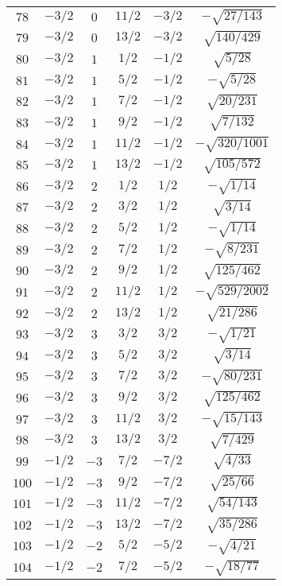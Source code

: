 \begin{table}
\begin{center}
\begin{tabular}{|c|c|c|c|c|c|}
$78$ & $-3/2$ & $0$ & $11/2$ & $-3/2$ & $-\sqrt{27/143}$ \\ 
$79$ & $-3/2$ & $0$ & $13/2$ & $-3/2$ & $\sqrt{140/429}$ \\ 
$80$ & $-3/2$ & $1$ & $1/2$ & $-1/2$ & $\sqrt{5/28}$ \\ 
$81$ & $-3/2$ & $1$ & $5/2$ & $-1/2$ & $-\sqrt{5/28}$ \\ 
$82$ & $-3/2$ & $1$ & $7/2$ & $-1/2$ & $\sqrt{20/231}$ \\ 
$83$ & $-3/2$ & $1$ & $9/2$ & $-1/2$ & $\sqrt{7/132}$ \\ 
$84$ & $-3/2$ & $1$ & $11/2$ & $-1/2$ & $-\sqrt{320/1001}$ \\ 
$85$ & $-3/2$ & $1$ & $13/2$ & $-1/2$ & $\sqrt{105/572}$ \\ 
$86$ & $-3/2$ & $2$ & $1/2$ & $1/2$ & $-\sqrt{1/14}$ \\ 
$87$ & $-3/2$ & $2$ & $3/2$ & $1/2$ & $\sqrt{3/14}$ \\ 
$88$ & $-3/2$ & $2$ & $5/2$ & $1/2$ & $-\sqrt{1/14}$ \\ 
$89$ & $-3/2$ & $2$ & $7/2$ & $1/2$ & $-\sqrt{8/231}$ \\ 
$90$ & $-3/2$ & $2$ & $9/2$ & $1/2$ & $\sqrt{125/462}$ \\ 
$91$ & $-3/2$ & $2$ & $11/2$ & $1/2$ & $-\sqrt{529/2002}$ \\ 
$92$ & $-3/2$ & $2$ & $13/2$ & $1/2$ & $\sqrt{21/286}$ \\ 
$93$ & $-3/2$ & $3$ & $3/2$ & $3/2$ & $-\sqrt{1/21}$ \\ 
$94$ & $-3/2$ & $3$ & $5/2$ & $3/2$ & $\sqrt{3/14}$ \\ 
$95$ & $-3/2$ & $3$ & $7/2$ & $3/2$ & $-\sqrt{80/231}$ \\ 
$96$ & $-3/2$ & $3$ & $9/2$ & $3/2$ & $\sqrt{125/462}$ \\ 
$97$ & $-3/2$ & $3$ & $11/2$ & $3/2$ & $-\sqrt{15/143}$ \\ 
$98$ & $-3/2$ & $3$ & $13/2$ & $3/2$ & $\sqrt{7/429}$ \\ 
$99$ & $-1/2$ & $-3$ & $7/2$ & $-7/2$ & $\sqrt{4/33}$ \\ 
$100$ & $-1/2$ & $-3$ & $9/2$ & $-7/2$ & $\sqrt{25/66}$ \\ 
$101$ & $-1/2$ & $-3$ & $11/2$ & $-7/2$ & $\sqrt{54/143}$ \\ 
$102$ & $-1/2$ & $-3$ & $13/2$ & $-7/2$ & $\sqrt{35/286}$ \\ 
$103$ & $-1/2$ & $-2$ & $5/2$ & $-5/2$ & $-\sqrt{4/21}$ \\ 
$104$ & $-1/2$ & $-2$ & $7/2$ & $-5/2$ & $-\sqrt{18/77}$ \\ 

\end{tabular}
\end{center}
\end{table}
